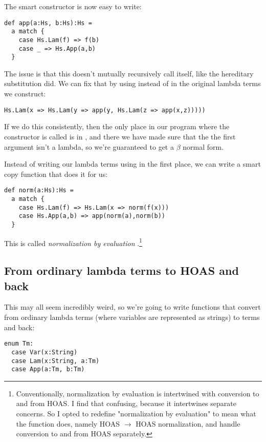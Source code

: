 The smart constructor  is now easy to write:

\begin{lstlisting}
def app(a:Hs, b:Hs):Hs =
  a match {
    case Hs.Lam(f) => f(b)
    case _ => Hs.App(a,b)
  }
\end{lstlisting}

The issue is that this doesn't mutually recursively call itself, like the hereditary substitution did.
We can fix that by using  instead of  in the original lambda terms we construct:

\begin{lstlisting}
Hs.Lam(x => Hs.Lam(y => app(y, Hs.Lam(z => app(x,z)))))
\end{lstlisting}

If we do this consistently, then the only place in our program where the constructor  is called is in , and there we have made sure that the the first argument isn't a lambda, so we're guaranteed to get a $\beta$ normal form.

Instead of writing our lambda terms using  in the first place, we can write a smart copy function that does it for us:

\begin{lstlisting}
def norm(a:Hs):Hs =
  a match {
    case Hs.Lam(f) => Hs.Lam(x => norm(f(x)))
    case Hs.App(a,b) => app(norm(a),norm(b))
  }
\end{lstlisting}

This is called \emph{normalization by evaluation} \cite{berger91}.\footnote{Conventionally, normalization by evaluation is intertwined with conversion to and from HOAS. I find that confusing, because it intertwines separate concerns. So I opted to redefine "normalization by evaluation" to mean what the  function does, namely HOAS $\to$ HOAS normalization, and handle conversion to and from HOAS separately.}

\subsection{From ordinary lambda terms to HOAS and back}

This may all seem incredibly weird, so we're going to write functions that convert from ordinary lambda terms (where variables are represented as strings) to  terms and back:

\begin{lstlisting}
enum Tm:
  case Var(x:String)
  case Lam(x:String, a:Tm)
  case App(a:Tm, b:Tm)
\end{lstlisting}

